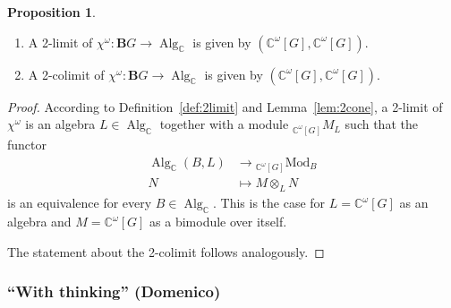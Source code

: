 \documentclass[12pt]{scrartcl}
\newcommand{\boldB}{\boldsymbol{B}}
\newcommand{\C}{\mathds{C}}
\def\lra{\longrightarrow}
\def\lmt{\longmapsto}
\newcommand{\Algc}{\operatorname{Alg}_{\C}}
\newcommand{\chiom}{\chi^\omega}
\newcommand{\CGtw}{\C^\omega[G]}
\theoremstyle{definition}
\newtheorem{proposition}[definition]{Proposition}
\numberwithin{equation}{section}
\numberwithin{definition}{section}
\numberwithin{figure}{section}
\begin{document}
\begin{proposition}
\begin{enumerate}
\item
A 2-limit of $\chiom \colon \boldB G \to \Algc$ is given by $(\CGtw, \CGtw)$. 
\item
A 2-colimit of $\chiom \colon \boldB G \to \Algc$ is given by $(\CGtw, \CGtw)$. 
\end{enumerate}
\end{proposition}

\begin{proof}
According to Definition~\ref{def:2limit} and Lemma~\ref{lem:2cone}, a 2-limit of $\chiom$ is an algebra $L \in \Algc$ together with a module ${}_{\CGtw} M_L$ such that the functor 
\begin{align*}
\Algc(B,L) 
& \lra {}_{\CGtw}\text{Mod}_B
\\
N & \lmt M \otimes_L N
\end{align*}
is an equivalence for every $B \in \Algc$. 
This is the case for $L = \CGtw$ as an algebra and $M = \CGtw$ as a bimodule over itself. 

The statement about the 2-colimit follows analogously. 
\end{proof}


\subsubsection{``With thinking'' (Domenico)}
\end{document}
